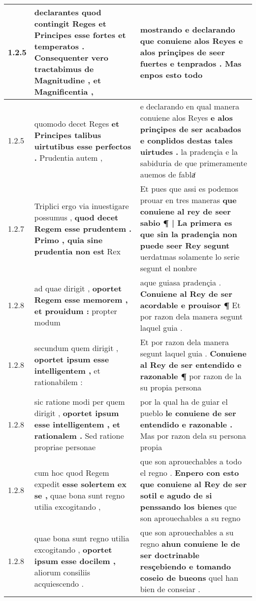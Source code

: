 \begin{tabular}{|p{1cm}|p{6.5cm}|p{6.5cm}|}
1.2.5 & declarantes quod contingit Reges \textbf{ et Principes esse fortes et temperatos . } Consequenter vero tractabimus de Magnitudine , et Magnificentia , & mostrando e declarando \textbf{ que conuiene alos Reyes e alos prinçipes de seer fuertes e tenprados . } Mas enpos esto todo \\\hline
1.2.5 & quomodo decet Reges \textbf{ et Principes talibus uirtutibus esse perfectos . } Prudentia autem , & e declarando en qual manera conuiene alos Reyes \textbf{ e alos prinçipes de ser acabados e conplidos destas tales uirtudes . } la pradençia e la sabiduria de que primeramente auemos de fablaͬ \\\hline
1.2.7 & Triplici ergo via inuestigare possumus , \textbf{ quod decet Regem esse prudentem . Primo , quia sine prudentia non est } Rex & Et pues que assi es podemos prouar en tres maneras \textbf{ que conuiene al rey de seer sabio ¶ | La primera es que sin la pradençia non puede seer Rey segunt } uerdatmas solamente lo serie segunt el nonbre \\\hline
1.2.8 & ad quae dirigit , \textbf{ oportet Regem esse memorem , et prouidum : } propter modum & aque guiasa pradençia . \textbf{ Conuiene al Rey de ser acordable e prouisor ¶ } Et por razon dela manera segunt laquel guia . \\\hline
1.2.8 & secundum quem dirigit , \textbf{ oportet ipsum esse intelligentem , } et rationabilem : & Et por razon dela manera segunt laquel guia . \textbf{ Conuiene al Rey de ser entendido e razonable ¶ } por razon de la su propia persona \\\hline
1.2.8 & sic ratione modi per quem dirigit , \textbf{ oportet ipsum esse intelligentem , et rationalem . } Sed ratione propriae personae & por la qual ha de guiar el pueblo \textbf{ le conuiene de ser entendido e razonable . } Mas por razon dela su persona propia \\\hline
1.2.8 & cum hoc quod Regem expedit \textbf{ esse solertem ex se , } quae bona sunt regno utilia excogitando , & que son aprouechables a todo el regno . \textbf{ Enpero con esto que conuiene al Rey de ser sotil e agudo de si penssando los bienes } que son aprouechables a su regno \\\hline
1.2.8 & quae bona sunt regno utilia excogitando , \textbf{ oportet ipsum esse docilem , } aliorum consiliis acquiescendo . & que son aprouechables a su regno \textbf{ ahun conuiene le de ser doctrinable resçebiendo e tomando coseio de bueons } quel han bien de conseiar . \\\hline

\end{tabular}
